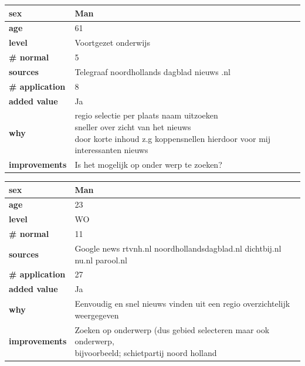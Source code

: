\documentclass[twoside,openright]{uva-bachelor-thesis}
\begin{document}
\begin{table}
	\centering
	\begin{tabular}{|l|l|}
		\hline
		\textbf{sex} & Man \\ \hline
		\textbf{age} & 61 \\ \hline
		\textbf{level} & Voortgezet onderwijs \\ \hline
		\textbf{\# normal} & 5 \\ \hline
		\textbf{sources} & Telegraaf noordhollands dagblad nieuws .nl
		 \\ \hline
		\textbf{\# application} & 8 \\ \hline
		\textbf{added value} & Ja \\ \hline
		\textbf{why} & \pbox{20cm}{regio selectie per plaats naam uitzoeken \\sneller over zicht van het nieuws 
		\\door korte inhoud z.g koppensnellen hierdoor voor mij interessanten nieuws}
		\\ \hline
		
		\textbf{improvements} & Is het mogelijk op onder werp te zoeken?
		 \\ \hline
	\end{tabular}
\end{table}
\begin{table}
	\centering
	\begin{tabular}{|l|l|}
		\hline
		\textbf{sex} & Man \\ \hline
		\textbf{age} & 23 \\ \hline
		\textbf{level} & WO \\ \hline
		\textbf{\# normal} & 11 \\ \hline
		\textbf{sources} & Google news
		rtvnh.nl
		noordhollandsdagblad.nl
		dichtbij.nl
		nu.nl
		parool.nl
		
		\\ \hline
		\textbf{\# application} & 27 \\ \hline
		\textbf{added value} & Ja \\ \hline
		\textbf{why} & Eenvoudig en snel nieuws vinden uit een regio
		overzichtelijk weergegeven
		
		\\ \hline
		
		\textbf{improvements} & \pbox{20cm}{Zoeken op onderwerp (dus gebied selecteren maar ook onderwerp,\\ bijvoorbeeld; schietpartij noord holland}
		
		\\ \hline
	\end{tabular}
\end{table}
\end{document}
